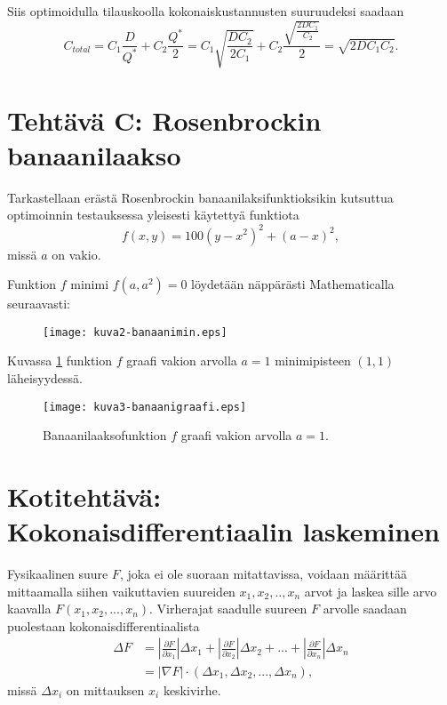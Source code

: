 \documentclass[a4paper,11pt]{article}
\begin{document}
{Siis optimoidulla tilauskoolla kokonaiskustannusten suuruudeksi saadaan
\begin{equation}
    C_{total} = C_1 \frac{D}{Q^*} + C_2 \frac{Q^*}{2} = C_1 \sqrt{\frac{DC_2}{2C_1}} + C_2 \frac{\sqrt{\frac{2DC_1}{C_2}}}{2} = \sqrt{2DC_1C_2}.
\end{equation}

\clearpage

\section{Tehtävä C: Rosenbrockin banaanilaakso}

Tarkastellaan erästä Rosenbrockin banaanilaksifunktioksikin kutsuttua optimoinnin testauksessa yleisesti käytettyä funktiota
\begin{equation}
    f(x,y)=100(y-x^2)^2+(a-x)^2,
\end{equation}
missä $a$ on vakio.

Funktion $f$ minimi $f(a,a^2)=0$ löydetään näppärästi Mathematicalla seuraavasti:
\begin{figure}[!htb]
    \texttt{[image: kuva2-banaanimin.eps]}
\end{figure}

Kuvassa \ref{fig:banana2} funktion $f$ graafi vakion arvolla $a=1$ minimipisteen $(1,1)$ läheisyydessä.
\begin{figure}[!htb]
    \centering
    \texttt{[image: kuva3-banaanigraafi.eps]}
    \caption{Banaanilaaksofunktion $f$ graafi vakion arvolla $a=1$.}
    \label{fig:banana2}
\end{figure}

\section{Kotitehtävä: Kokonaisdifferentiaalin laskeminen}

Fysikaalinen suure $F$, joka ei ole suoraan mitattavissa, voidaan määrittää mittaamalla siihen vaikuttavien suureiden $x_1,x_2,..,x_n$ arvot ja laskea sille arvo kaavalla $F(x_1,x_2,...,x_n)$. Virherajat saadulle suureen $F$ arvolle saadaan puolestaan kokonaisdifferentiaalista
\begin{align}
    \Delta F & = \left\lvert \frac{\partial F}{\partial x_1} \right\rvert \Delta x_1 + \left\lvert \frac{\partial F}{\partial x_2} \right\rvert \Delta x_2 + ... + \left\lvert \frac{\partial F}{\partial x_n} \right\rvert \Delta x_n\\
    & = \lvert \nabla F \rvert \cdot (\Delta x_1, \Delta x_2, ..., \Delta x_n),
\end{align}
missä $\Delta x_i$ on mittauksen $x_i$ keskivirhe.

}
\end{document}

